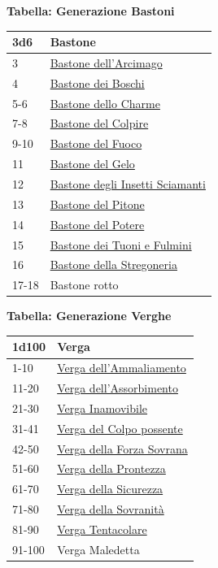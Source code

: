\begin{multicols}{2}
{\medskip

\textbf{Tabella: Generazione Bastoni}\hypertarget{Bastoni}{}

\medskip

{\small\begin{tabularx}{0.45\textwidth}{lX}
		\toprule
\textbf{3d6} & \textbf{Bastone}\\
\toprule
3 & \hyperlink{Bastonedell'Arcimago}{Bastone dell'Arcimago}\\
4 & \hyperlink{BastonedeiBoschi}{Bastone dei Boschi}\\
5-6 & \hyperlink{BastonedelloCharme}{Bastone dello Charme}\\
7-8 & \hyperlink{BastonedelColpire}{Bastone del Colpire}\\
9-10 & \hyperlink{BastonedelFuoco}{Bastone del Fuoco}\\
11 & \hyperlink{BastonedelGelo}{Bastone del Gelo}\\
12 & \hyperlink{BastonedegliInsettiSciamanti}{Bastone degli Insetti Sciamanti}\\
13 & \hyperlink{BastonedelPitone}{Bastone del Pitone}\\
14 & \hyperlink{BastonedelPotere}{Bastone del Potere}\\
15 & \hyperlink{BastonedeiTuonieFulmini}{Bastone dei Tuoni e Fulmini}\\
16 & \hyperlink{BastonedellaStregoneria}{Bastone della Stregoneria}\\
17-18 & Bastone rotto\\
\end{tabularx}}

\medskip

\textbf{Tabella: Generazione Verghe}\hypertarget{Verghe}{}

\medskip

{\small\begin{tabularx}{0.45\textwidth}{lX}
		\toprule
\textbf{1d100} & \textbf{Verga}\\
\toprule
1-10 & \hyperlink{Vergadell'Ammaliamento}{Verga dell'Ammaliamento}\\
11-20 & \hyperlink{Vergadell'Assorbimento}{Verga dell'Assorbimento}\\
21-30 & \hyperlink{VergaInamovibile}{Verga Inamovibile}\\
31-41 & \hyperlink{VergadelColpopossente}{Verga del Colpo possente}\\
42-50 & \hyperlink{VergadellaForzaSovrana}{Verga della Forza Sovrana}\\
51-60 & \hyperlink{VergadellaProntezza}{Verga della Prontezza}\\
61-70 & \hyperlink{VergadellaSicurezza}{Verga della Sicurezza}\\
71-80 & \hyperlink{VergadellaSovranità}{Verga della Sovranità}\\
81-90 & \hyperlink{VergaTentacolare}{Verga Tentacolare}\\
91-100 & Verga Maledetta\\
\end{tabularx}}

}
\end{multicols}

